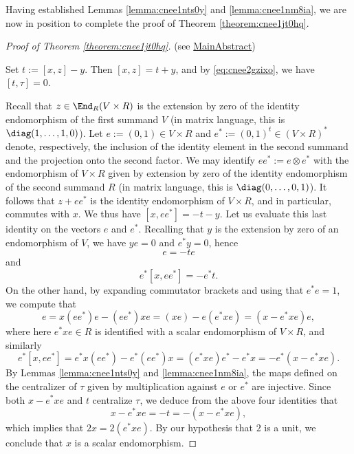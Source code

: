 \documentclass[reqno]{amsart} 
\begin{document}
Having established Lemmas \ref{lemma:cnee1nts0y} and \ref{lemma:cnee1nm8ia}, we are now in position to complete the proof of Theorem \ref{theorem:cnee1jt0hq}.
\begin{proof}[Proof of Theorem \ref{theorem:cnee1jt0hq}]
  (see  \href{MainAbstract.lean}{MainAbstract})
  
  Set $t := [x,z] - y$.  Then $[x,z] = t + y$, and by \eqref{eq:cnee2gzixo}, we have $[t,\tau] = 0$.

  Recall that $z \in \End_R(V \times R)$ is the extension by zero of the identity endomorphism of the first summand $V$ (in matrix language, this is $\diag(1,\dotsc,1,0)$).  Let $e := (0,1) \in V \times R$ and $e^* := (0,1)^t \in (V \times R)^*$ denote, respectively, the inclusion of the identity element in the second summand and the projection onto the second factor.  We may identify $e e^* := e \otimes e^*$ with the endomorphism of $V \times R$ given by extension by zero of the identity endomorphism of the second summand $R$ (in matrix language, this is $\diag(0,\dotsc,0,1)$).  It follows that $z + e e^*$ is the identity endomorphism of $V \times R$, and in particular, commutes with $x$.  We thus have $[x,e e^*] = - t - y$.  Let us evaluate this last identity on the vectors $e$ and $e^*$.  Recalling that $y$ is the extension by zero of an endomorphism of $V$, we have $y e = 0$ and $e^* y = 0$, hence
  \begin{equation*} [x, ee^*] e = - t e
  \end{equation*}
  and
  \begin{equation*}
    e^* [x, e e^* ] = - e^* t.
  \end{equation*}
  On the other hand, by expanding commutator brackets and using that $e^* e = 1$, we compute that
  \begin{equation*} [x, e e^*] e = x (e e^*) e - (e e^*) x e = (x e) - e (e^* x e) = (x - e^* x e) e,
  \end{equation*}
  where here $e^* x e \in R$ is identified with a scalar endomorphism of $V \times R$, and similarly
  \begin{equation*}
    e^* [x, e e^*] = e^* x (e e^*)  - e^* (e e^*) x = (e^* x e) e^* - e^* x = - e^* (x - e^* x e).
  \end{equation*}
  By Lemmas \ref{lemma:cnee1nts0y} and \ref{lemma:cnee1nm8ia}, the maps defined on the centralizer of $\tau$ given by multiplication against $e$ or $e^*$ are injective.  Since both $x - e^* x e$ and $t$ centralize $\tau$, we deduce from the above four identities that
  \begin{equation*}
    x - e^* x e = - t = - (x - e^* x e),
  \end{equation*}
  which implies that $2 x = 2 (e^* x e)$.  By our hypothesis that $2$ is a unit, we conclude that $x$ is a scalar endomorphism.
\end{proof}
\end{document}
